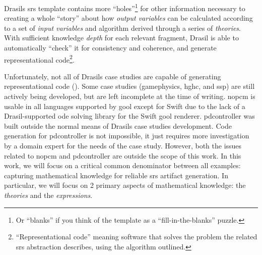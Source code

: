 Drasils \acs{srs} template contains more ``holes''\footnote{Or ``blanks'' if you
      think of the template as a ``fill-in-the-blanks'' puzzle.} for other information
necessary to creating a whole ``story'' about how \textit{output variables} can
be calculated according to a set of \textit{input variables} and algorithm
derived through a series of \textit{theories}. With sufficient knowledge
\textit{depth} for each relevant fragment, Drasil is able to automatically
``check'' it for consistency and coherence, and generate representational
code\footnote{``Representational code'' meaning software that solves the problem
      the related \acs{srs} abstraction describes, using the algorithm outlined.}.

Unfortunately, not all of Drasils case studies are capable of generating
representational code (). Some case studies
(\acs{gamephysics}, \acs{hghc}, and \acs{ssp}) are still actively being
developed, but are left incomplete at the time of writing. \acs{nopcm} is usable
in all languages supported by \acs{gool} except for Swift due to the lack of a
Drasil-supported \acs{ode} solving library for the Swift \acs{gool} renderer.
\acs{pdcontroller} was built \cite{DrasilPR2289Naveen} outside  the normal means
of Drasils case studies development. Code generation for \acs{pdcontroller} is
not impossible, it just requires more investigation by a domain expert for the
needs of the case study. However, both the issues related to \acs{nopcm} and
\acs{pdcontroller} are outside the scope of this work. In this work, we will
focus on a critical common denominator between all examples: capturing
mathematical knowledge for reliable \acs{srs} artifact generation. In
particular, we will focus on 2 primary aspects of mathematical knowledge: the
\textit{theories} and the \textit{expressions}.

\caseStudiesCodeTable{}

